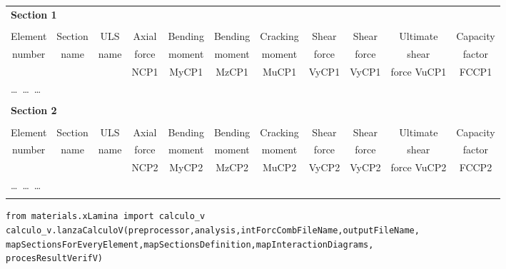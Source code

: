 \begin{footnotesize}
\begin{center}
\begin{tabular}{ccccccccccc}
\multicolumn{7}{l}{\textbf{Section 1}} \\
\\
Element & Section & ULS  & Axial      & Bending      & Bending      & Cracking       & Shear       & Shear       & Ultimate & Capacity \\
number  & name    & name & force      & moment       & moment       & moment & force       & force       & shear    & factor       \\
        &         &      &       NCP1 &        MyCP1 &        MzCP1 & MuCP1          &       VyCP1 &       VyCP1 & force VuCP1 & FCCP1 \\
\hline
\multicolumn{7}{l}{\ldots\ \ldots\ \ldots} \\
\\
\multicolumn{7}{l}{\textbf{Section 2}} \\
\\
Element & Section & ULS  & Axial      & Bending      & Bending      & Cracking       & Shear       & Shear       & Ultimate & Capacity \\
number  & name    & name & force      & moment       & moment       & moment & force       & force       & shear    & factor       \\
        &         &      &       NCP2 &        MyCP2 &        MzCP2 & MuCP2          &       VyCP2 &       VyCP2 & force VuCP2 &       FCCP2 \\


\hline
\multicolumn{7}{l}{\ldots\ \ldots\ \ldots} \\
\\

\end{tabular}
\end{center}
\end{footnotesize}


\begin{verbatim}
from materials.xLamina import calculo_v
calculo_v.lanzaCalculoV(preprocessor,analysis,intForcCombFileName,outputFileName, 
mapSectionsForEveryElement,mapSectionsDefinition,mapInteractionDiagrams,
procesResultVerifV)
\end{verbatim}

\begin{paramFuncTable}
\preprocessor{} \\
\analysis{} \\
\\
\outputFileName{}\\
\mapSectionsForEveryElement{} \\
\mapSectionsDefinition{} \\
\mapInteractionDiagrams{} \\
\procesResultVerifV{} \\
\end{paramFuncTable}


